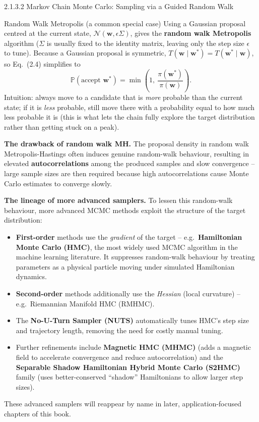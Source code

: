 \documentclass[aspectratio=169,10pt]{beamer}
\begin{document}
\begin{frame}[allowframebreaks]{2.1.3.2 Markov Chain Monte Carlo: Sampling via a Guided Random Walk}
  \begin{block}{Random Walk Metropolis (a common special case)}
    Using a Gaussian proposal centred at the current state,
    $\mathcal{N}(\mathbf{w}, \epsilon\Sigma)$, gives the \textbf{random walk
    Metropolis} algorithm ($\Sigma$ is usually fixed to the identity matrix,
    leaving only the step size $\epsilon$ to tune). Because a Gaussian
    proposal is symmetric, $T(\mathbf{w}\mid\mathbf{w}^*) = T(\mathbf{w}^*\mid\mathbf{w})$,
    so Eq.~(2.4) simplifies to
    \[
      \mathbb{P}(\text{accept } \mathbf{w}^*) = \min\left(1,\ \frac{\pi(\mathbf{w}^*)}{\pi(\mathbf{w})}\right).
      \tag{2.5}
    \]
    Intuition: always move to a candidate that is \emph{more} probable than
    the current state; if it is \emph{less} probable, still move there with
    a probability equal to how much less probable it is (this is what lets
    the chain fully explore the target distribution rather than getting
    stuck on a peak).
  \end{block}

  \framebreak

  \textbf{The drawback of random walk MH.} The proposal density in random
  walk Metropolis-Hastings often induces genuine random-walk behaviour,
  resulting in elevated \textbf{autocorrelations} among the produced
  samples and slow convergence -- large sample sizes are then required
  because high autocorrelations cause Monte Carlo estimates to converge
  slowly.

  \textbf{The lineage of more advanced samplers.} To lessen this random-walk
  behaviour, more advanced MCMC methods exploit the structure of the target
  distribution:
  \begin{itemize}
    \item \textbf{First-order} methods use the \emph{gradient} of the
      target -- e.g.\ \textbf{Hamiltonian Monte Carlo (HMC)}, the most
      widely used MCMC algorithm in the machine learning literature. It
      suppresses random-walk behaviour by treating parameters as a physical
      particle moving under simulated Hamiltonian dynamics.
    \item \textbf{Second-order} methods additionally use the \emph{Hessian}
      (local curvature) -- e.g.\ Riemannian Manifold HMC (RMHMC).
    \item The \textbf{No-U-Turn Sampler (NUTS)} automatically tunes HMC's
      step size and trajectory length, removing the need for costly manual
      tuning.
    \item Further refinements include \textbf{Magnetic HMC (MHMC)} (adds a
      magnetic field to accelerate convergence and reduce
      autocorrelation) and the \textbf{Separable Shadow Hamiltonian Hybrid
      Monte Carlo (S2HMC)} family (uses better-conserved ``shadow''
      Hamiltonians to allow larger step sizes).
  \end{itemize}
  These advanced samplers will reappear by name in later, application-focused
  chapters of this book.
\end{frame}
\end{document}
